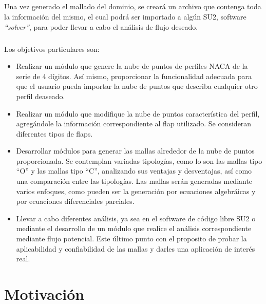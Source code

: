 \documentclass[letterpaper, openright, 12pt]{book}
\begin{document}
    \paragraph*{}
    Una vez generado el mallado del dominio, se creará un archivo que
    contenga toda la información del mismo, el cual podrá ser importado a
    algún SU2, software \textit{``solver''}, para poder llevar a cabo el
    análisis de flujo deseado.

    \paragraph*{}
    Los objetivos particulares son:
        \begin{itemize}
            \item{Realizar un módulo que genere la nube de puntos de perfiles
                NACA de la serie de 4 dígitos. Así mismo, proporcionar la
                funcionalidad adecuada para que el usuario pueda importar la
                nube de puntos que describa cualquier otro perfil deaseado.}
            \item{Realizar un módulo que modifique la nube de puntos
                característica del perfil, agregándole la información
                correspondiente al flap utilizado. Se consideran
                diferentes tipos de flaps.}
            \item{Desarrollar módulos para generar las mallas alrededor de la
                nube de puntos proporcionada. Se contemplan variadas tipologías,
                como lo son las mallas tipo “O” y las mallas tipo “C”,
                analizando sus ventajas y desventajas, así como una comparación
                entre las tipologías. Las mallas serán generadas mediante varios
                enfoques, como pueden ser la generación por ecuaciones
                algebráicas y por ecuaciones diferenciales parciales.}
            \item{Llevar a cabo diferentes análisis, ya sea en el software de
                código libre SU2 o mediante el desarrollo de un módulo
                que realice el análisis correspondiente mediante flujo 
                potencial. Este último punto con el proposito de probar la
                aplicabilidad y confiabilidad de las mallas y darles una
                aplicación de interés real.}
        \end{itemize}




    \chapter*{Motivación}
\end{document}
